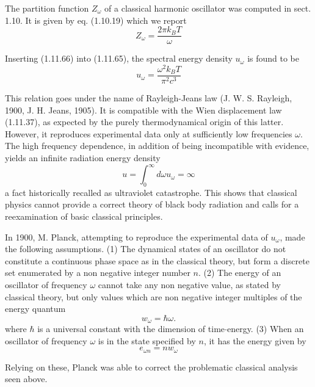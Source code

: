\documentclass{article}
\begin{document}
The partition function $Z_{\omega}$ of a classical harmonic oscillator was computed in sect. 1.10. It is given by eq. (1.10.19) which we report
$$
\begin{equation*}
Z_{\omega}=\frac{2 \pi k_{B} T}{\omega} \tag{1.11.66}
\end{equation*}
$$

Inserting (1.11.66) into (1.11.65), the spectral energy density $u_{\omega}$ is found to be
$$
\begin{equation*}
u_{\omega}=\frac{\omega^{2} k_{B} T}{\pi^{2} c^{3}} \tag{1.11.67}
\end{equation*}
$$

This relation goes under the name of Rayleigh-Jeans law (J. W. S. Rayleigh, 1900, J. H. Jeans, 1905). It is compatible with the Wien displacement law (1.11.37), as expected by the purely thermodynamical origin of this latter. However, it reproduces experimental data only at sufficiently low frequencies $\omega$. The high frequency dependence, in addition of being incompatible with evidence, yields an infinite radiation energy density
$$
\begin{equation*}
u=\int_{0}^{\infty} d \omega u_{\omega}=\infty \tag{1.11.68}
\end{equation*}
$$
a fact historically recalled as ultraviolet catastrophe. This shows that classical physics cannot provide a correct theory of black body radiation and calls for a reexamination of basic classical principles.

In 1900, M. Planck, attempting to reproduce the experimental data of $u_{\omega}$, made the following assumptions.
(1) The dynamical states of an oscillator do not constitute a continuous phase space as in the classical theory, but form a discrete set enumerated by a non negative integer number $n$.
(2) The energy of an oscillator of frequency $\omega$ cannot take any non negative value, as stated by classical theory, but only values which are non negative integer multiples of the energy quantum
$$
\begin{equation*}
w_{\omega}=\hbar \omega . \tag{1.11.69}
\end{equation*}
$$
where $\hbar$ is a universal constant with the dimension of time$\cdot$energy.
(3) When an oscillator of frequency $\omega$ is in the state specified by $n$, it has the energy given by
$$
\begin{equation*}
e_{\omega n}=n w_{\omega} \tag{1.11.70}
\end{equation*}
$$

Relying on these, Planck was able to correct the problematic classical analysis seen above.
\end{document}
